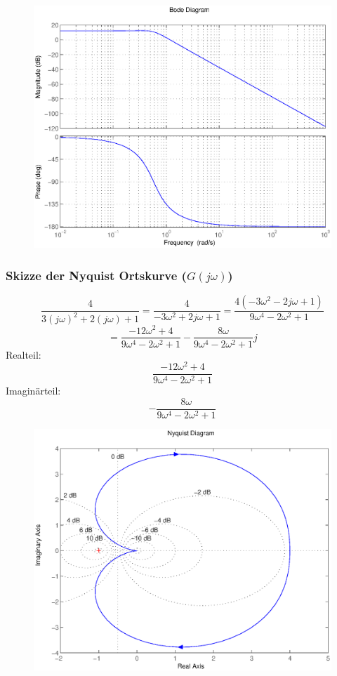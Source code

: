 \documentclass[a4paper,10pt,fleqn]{article}
\begin{document}
\begin{figure}[h!]
\center
\includegraphics[width=\textwidth]{bode.eps}
\end{figure}

\subsubsection*{Skizze der Nyquist Ortskurve ($G(j\omega)$)}
\[ \frac{4}{3(j\omega)^2 + 2(j\omega) + 1} = \frac{4}{-3 \omega^2 + 2 j \omega + 1} 
= \frac{4 (-3 \omega^2 - 2 j \omega + 1)}{9 \omega^4 - 2 \omega^2  + 1} \]
\[ = \frac{-12 \omega^2 + 4}{9 \omega^4 - 2 \omega^2 + 1} - \frac{8 \omega}{9 \omega^4 - 2 \omega^2 + 1}j \]
Realteil: 
\[  \frac{-12 \omega^2 + 4}{9 \omega^4 - 2 \omega^2 + 1} \]
Imaginärteil: 
\[ - \frac{8 \omega}{9 \omega^4 - 2 \omega^2 + 1} \]
\begin{figure}[h!]
\center
\includegraphics[width=\textwidth]{nyquist.eps}
\end{figure}
\end{document}
